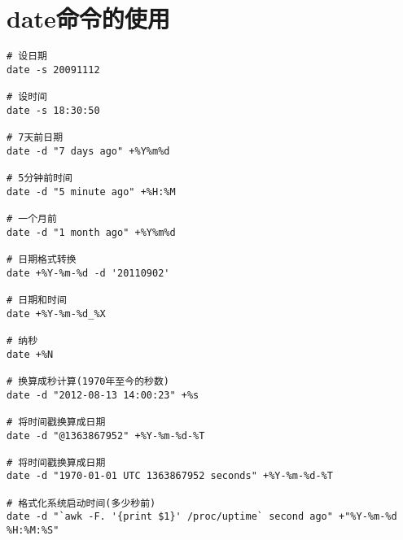
\section{date命令的使用}
\label{sec:dateCmd}


\small{
\begin{verbatim}
# 设日期
date -s 20091112                     

# 设时间
date -s 18:30:50                     

# 7天前日期
date -d "7 days ago" +%Y%m%d         

# 5分钟前时间
date -d "5 minute ago" +%H:%M        

# 一个月前
date -d "1 month ago" +%Y%m%d        

# 日期格式转换
date +%Y-%m-%d -d '20110902'         

# 日期和时间
date +%Y-%m-%d_%X                    

# 纳秒
date +%N                             

# 换算成秒计算(1970年至今的秒数)
date -d "2012-08-13 14:00:23" +%s    

# 将时间戳换算成日期
date -d "@1363867952" +%Y-%m-%d-%T   

# 将时间戳换算成日期
date -d "1970-01-01 UTC 1363867952 seconds" +%Y-%m-%d-%T  

# 格式化系统启动时间(多少秒前)
date -d "`awk -F. '{print $1}' /proc/uptime` second ago" +"%Y-%m-%d %H:%M:%S"    
\end{verbatim}
}
\normalsize